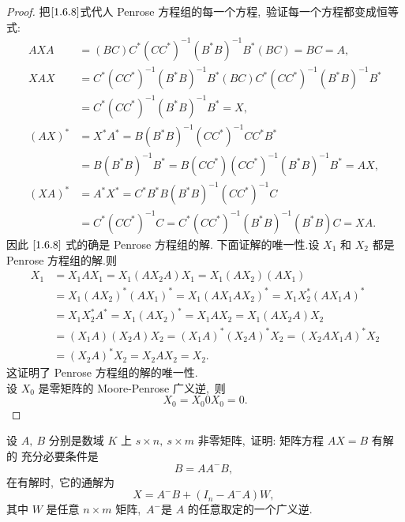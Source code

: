 \begin{proof}
	把$\eqref{1.6.8}$式代人 Penrose 方程组的每一个方程,\  验证每一个方程都变成恒等式:
	$$\begin{aligned}
		A X A & =(B C) C^{*}\left(C C^{*}\right)^{-1}\left(B^{*} B\right)^{-1} B^{*}(B C)=B C=A,\  \\
		X A X & =C^{*}\left(C C^{*}\right)^{-1}\left(B^{*} B\right)^{-1} B^{*}(B C) C^{*}\left(C C^{*}\right)^{-1}\left(B^{*} B\right)^{-1} B^{*} \\
		& =C^{*}\left(C C^{*}\right)^{-1}\left(B^{*} B\right)^{-1} B^{*}=X,\  \\
		(A X)^{*} & =X^{*} A^{*}=B\left(B^{*} B\right)^{-1}\left(C C^{*}\right)^{-1} C C^{*} B^{*} \\
		& =B\left(B^{*} B\right)^{-1} B^{*}=B\left(C C^{*}\right)\left(C C^{*}\right)^{-1}\left(B^{*} B\right)^{-1} B^{*}=A X,\  \\
		(X A)^{*} & =A^{*} X^{*}=C^{*} B^{*} B\left(B^{*} B\right)^{-1}\left(C C^{*}\right)^{-1} C \\
		& =C^{*}\left(C C^{*}\right)^{-1} C=C^{*}\left(C C^{*}\right)^{-1}\left(B^{*} B\right)^{-1}\left(B^{*} B\right) C=X A .
	\end{aligned}$$
	因此 $\eqref{1.6.8}$ 式的确是 Penrose 方程组的解.
	下面证解的唯一性.设 $ X_{1} $ 和 $ X_{2} $ 都是 Penrose 方程组的解.则
	$$\begin{aligned}
		X_{1}&=X_{1} A X_{1}=X_{1}\left(A X_{2} A\right) X_{1}=X_{1}\left(A X_{2}\right)\left(A X_{1}\right)\\
		&=X_{1}\left(A X_{2}\right)^{*}\left(A X_{1}\right)^{*}=X_{1}\left(A X_{1} A X_{2}\right)^{*}=X_{1} X_{2}^{*}\left(A X_{1} A\right)^{*} \\
		&=X_{1} X_{2}^{*} A^{*}=X_{1}\left(A X_{2}\right)^{*}=X_{1} A X_{2}=X_{1}\left(A X_{2} A\right) X_{2} \\
		&=\left(X_{1} A\right)\left(X_{2} A\right) X_{2}=\left(X_{1} A\right)^{*}\left(X_{2} A\right)^{*} X_{2}=\left(X_{2} A X_{1} A\right)^{*} X_{2} \\
		&=\left(X_{2} A\right)^{*} X_{2}=X_{2} A X_{2}=X_{2} .
	\end{aligned}$$
	这证明了 Penrose 方程组的解的唯一性.\\
	设 $ X_{0} $ 是零矩阵的 Moore-Penrose 广义逆,\ 则
	$$X_{0}=X_{0} 0 X_{0}=0.$$
\end{proof}
\newpage
\begin{problem}
	设 $ A,\  B $ 分别是数域 $ K $ 上  $s \times n,\  s \times m $ 非零矩阵,\  证明: 矩阵方程 $ A X=B $ 有解的 充分必要条件是
	$$B=A A^{-} B,\ $$
	在有解时,\  它的通解为
	$$X=A^{-} B+\left(I_{n}-A^{-} A\right) W,\ $$
	其中  $W$  是任意  $n \times m$  矩阵,\  $ A^{-} $是 $ A$  的任意取定的一个广义逆.
\end{problem}
